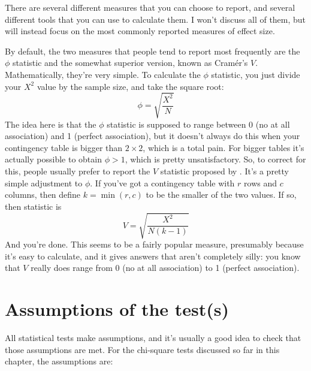 There are several different measures that you can choose to report, and several different tools that you can use to calculate them. I won't discuss all of them, but will instead focus on the most commonly reported measures of effect size. 

By default, the two measures that people tend to report most frequently are the $\phi$ statistic and the somewhat superior version, known as  Cram\'er's $V$. Mathematically, they're very simple. To calculate the $\phi$ statistic, you just divide your $X^2$ value by the sample size, and take the square root:
$$ 
\phi = \sqrt{\frac{X^2}{N}}
$$
The idea here is that the $\phi$ statistic is supposed to range between 0 (no at all association) and 1 (perfect association), but it doesn't always do this when your contingency table is bigger than $2 \times 2$, which is a total pain. For bigger tables it's actually possible to obtain $\phi>1$, which is pretty unsatisfactory. So, to correct for this, people usually prefer to report the $V$ statistic proposed by . It's a pretty simple adjustment to $\phi$. If you've got a contingency table with $r$ rows and $c$ columns, then define $k = \min(r,c)$ to be the smaller of the two values. If so, then  statistic is
$$
V = \sqrt{\frac{X^2}{N(k-1)}}
$$
And you're done. This seems to be a fairly popular measure, presumably because it's easy to calculate, and it gives answers that aren't completely silly: you know that $V$ really does range from 0 (no at all association) to 1 (perfect association). 


\section{Assumptions of the test(s)~\label{sec:chisqassumptions}}

All statistical tests make assumptions, and it's usually a good idea to check that those assumptions are met. For the chi-square tests discussed so far in this chapter, the assumptions are:

